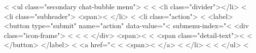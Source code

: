 {              <%
            <ul class="secondary chat-bubble menu">
              <%
                <%
                  <li class="divider"></li>
                <%
                  <li class="subheader">
                  <span><%
                  </li>
                <%
                  <li class="action">
                    <%
                      <label>
                          <button type="submit"
                                  name="action"
                                  data-value="<%
                                  submenu-index="<%
                              <div class="icon-frame">
                                <%
                                  <%
                                <%
                              </div>
                              <span><%
                              <%
                              <span class="detail-text"><%
                              <%
                          </button>
                      </label>
                    <%
                      <a href="<%
                          <%
                          <span><%
                      </a>
                    <%
                  </li>
                <%
              <%
            </ul>
              <%

}
